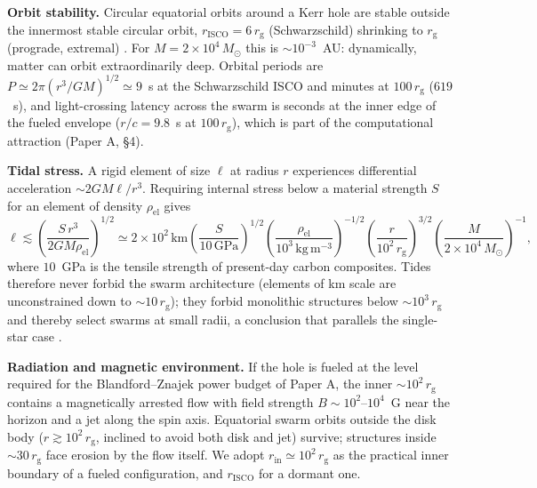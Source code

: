 \documentclass[11pt]{article}
\newcommand{\msun}{\ensuremath{M_\odot}}
\newcommand{\rg}{\ensuremath{r_{\mathrm{g}}}}
\begin{document}
\textbf{Orbit stability.} Circular equatorial orbits around a Kerr hole are stable outside the innermost stable circular orbit, $r_{\mathrm{ISCO}} = 6\,\rg$ (Schwarzschild) shrinking to $\rg$ (prograde, extremal) \citep{BardeenPressTeukolsky1972}. For $M = 2\times10^{4}\,\msun$ this is $\sim 10^{-3}$~AU: dynamically, matter can orbit extraordinarily deep. Orbital periods are $P \simeq 2\pi (r^{3}/GM)^{1/2} \simeq 9$~s at the Schwarzschild ISCO and minutes at $100\,\rg$ ($619$~s), and light-crossing latency across the swarm is seconds at the inner edge of the fueled envelope ($r/c = 9.8$~s at $100\,\rg$), which is part of the computational attraction (Paper A, \S4).

\textbf{Tidal stress.} A rigid element of size $\ell$ at radius $r$ experiences differential acceleration $\sim 2GM\ell/r^{3}$. Requiring internal stress below a material strength $S$ for an element of density $\rho_{\mathrm{el}}$ gives
\begin{equation}
\ell \lesssim \left(\frac{S\,r^{3}}{2GM\rho_{\mathrm{el}}}\right)^{1/2}
\simeq 2\times10^{2}\,\mathrm{km}
\left(\frac{S}{10\,\mathrm{GPa}}\right)^{1/2}
\left(\frac{\rho_{\mathrm{el}}}{10^{3}\,\mathrm{kg\,m^{-3}}}\right)^{-1/2}
\left(\frac{r}{10^{2}\,\rg}\right)^{3/2}
\left(\frac{M}{2\times10^{4}\,\msun}\right)^{-1},
\end{equation}
where $10$~GPa is the tensile strength of present-day carbon composites. Tides therefore never forbid the swarm architecture (elements of km scale are unconstrained down to $\sim 10\,\rg$); they forbid monolithic structures below $\sim 10^{3}\,\rg$ and thereby select swarms at small radii, a conclusion that parallels the single-star case \citep{Wright2020}.

\textbf{Radiation and magnetic environment.} If the hole is fueled at the level required for the Blandford--Znajek power budget of Paper A, the inner $\sim 10^{2}\,\rg$ contains a magnetically arrested flow with field strength $B \sim 10^{2}$--$10^{4}$~G near the horizon \citep{Tchekhovskoy2011,Narayan2022} and a jet along the spin axis. Equatorial swarm orbits outside the disk body ($r \gtrsim 10^{2}\,\rg$, inclined to avoid both disk and jet) survive; structures inside $\sim 30\,\rg$ face erosion by the flow itself. We adopt $r_{\mathrm{in}} \simeq 10^{2}\,\rg$ as the practical inner boundary of a fueled configuration, and $r_{\mathrm{ISCO}}$ for a dormant one.
\end{document}

